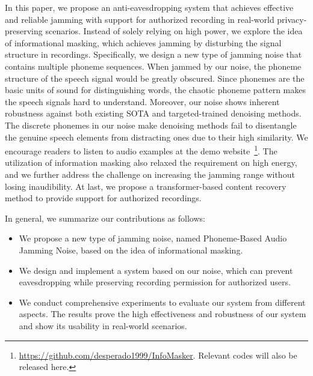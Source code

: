 In this paper, we propose an anti-eavesdropping system that achieves effective and reliable jamming with support for authorized recording in real-world privacy-preserving scenarios. Instead of solely relying on high power, we explore the idea of informational masking, which achieves jamming by disturbing the signal structure in recordings. Specifically, we design a new type of jamming noise that contains multiple phoneme sequences. When jammed by our noise, the phoneme structure of the speech signal would be greatly obscured. Since phonemes are the basic units of sound for distinguishing words, the chaotic phoneme pattern makes the speech signals hard to understand. Moreover, our noise shows inherent robustness against both existing SOTA and targeted-trained denoising methods. The discrete phonemes in our noise make denoising methods fail to disentangle the genuine speech elements from distracting ones due to their high similarity. We encourage readers to listen to audio examples at the demo website~\footnote{\url{https://github.com/desperado1999/InfoMasker}. Relevant codes will also be released here.}. The utilization of information masking also relaxed the requirement on high energy, and we further address the challenge on increasing the jamming range without losing inaudibility. At last, we propose a transformer-based content recovery method to provide support for authorized recordings.

In general, we summarize our contributions as follows:
\begin{itemize}
    \item We propose a new type of jamming noise, named Phoneme-Based Audio Jamming Noise, based on the idea of informational masking.
    \item We design and implement a system based on our noise, which can prevent eavesdropping while preserving recording permission for authorized users.
    \item We conduct comprehensive experiments to evaluate our system from different aspects. The results prove the high effectiveness and robustness of our system and show its usability in real-world scenarios.
\end{itemize}